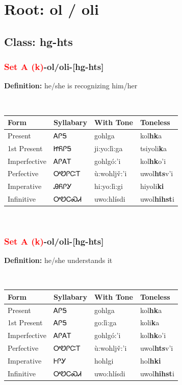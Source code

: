 \needspace{4in}
\section*{Root: ol / oli}
\nopagebreak
{}
\needspace{3in}
\subsection*{Class: hg-hts}
\nopagebreak
\needspace{2in}
\subsubsection*{\textcolor{Red}{Set A (k)}{-}\textbf{ol/oli}{-}[hg-hts]}
\nopagebreak
\textbf{Definition: } he/she is recognizing him/her
\\[0.5em]
\begin{tabularx}{\textwidth}{l X X X}%
\toprule%
\textbf{Form}&\textbf{Syllabary}&\textbf{With Tone}&\textbf{Toneless}\\%
\midrule%
Present&ᎪᎵᎦ&gohlga&kol\textbf{hk}a\\%
1st Present&ᏥᏲᎵᎦ&ji:yo:lì:ga&tsiyoli\textbf{k}a\\%
Imperfective&ᎪᎵᎪᎢ&gohlgó:’i&kol\textbf{hk}o'i\\%
Perfective&ᎤᏬᎵᏨᎢ&ù:wohljv̌:’i&uwol\textbf{hts}v'i\\%
Imperative&ᎯᏲᎵᎩ&hi:yo:lì:gi&hiyoli\textbf{ki}\\%
Infinitive&ᎤᏬᏟᏍᏗ&uwo:hlísdi&uwol\textbf{hihst}i\\%
\bottomrule%
\end{tabularx}
\\[1em]
\needspace{2in}
\subsubsection*{\textcolor{Red}{Set A (k)}{-}\textbf{ol/oli}{-}[hg-hts]}
\nopagebreak
\textbf{Definition: } he/she understands it
\\[0.5em]
\begin{tabularx}{\textwidth}{l X X X}%
\toprule%
\textbf{Form}&\textbf{Syllabary}&\textbf{With Tone}&\textbf{Toneless}\\%
\midrule%
Present&ᎪᎵᎦ&gohlga&kol\textbf{hk}a\\%
1st Present&ᎪᎵᎦ&go:lì:ga&koli\textbf{k}a\\%
Imperfective&ᎪᎵᎪᎢ&gohlgó:’i&kol\textbf{hk}o'i\\%
Perfective&ᎤᏬᎵᏨᎢ&ù:wohljv̌:’i&uwol\textbf{hts}v'i\\%
Imperative&ᎰᎵᎩ&hohlgi&hol\textbf{hki}\\%
Infinitive&ᎤᏬᏟᏍᏗ&uwo:hlísdi&uwol\textbf{hihst}i\\%
\bottomrule%
\end{tabularx}
\\[1em]
\needspace{3in}
